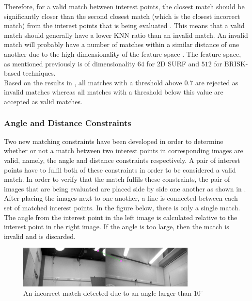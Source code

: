 \documentclass{article}
\begin{document}
Therefore, for a valid match between interest points, the closest match should be significantly closer than the second closest match (which is the closest incorrect match) from the interest points that is being evaluated \cite{Lowe2004}. This means that a valid match should generally have a lower KNN ratio than an invalid match. An invalid match will probably have a number of matches within a similar distance of one another due to the high dimensionality of the feature space \cite{Lowe2004}. The feature space, as mentioned previously is of dimensionality $64$ for 2D SURF and $512$ for BRISK-based techniques.\\

Based on the results in , all matches with a threshold above $0.7$ are rejected as invalid matches whereas all matches with a threshold below this value are accepted as valid matches.\\



\subsubsection{Angle and Distance Constraints}
\label{sec:angleDistanceConstraints}
Two new matching constraints have been developed in order to determine whether or not a match between two interest points in corresponding images are valid, namely, the angle and distance constraints respectively. A pair of interest points have to fulfil both of these constraints in order to be considered a valid match. In order to verify that the match fulfils these constraints, the pair of images that are being evaluated are placed side by side one another as shown in . After placing the images next to one another, a line is connected between each set of matched interest points. In the figure below, there is only a single match. The angle from the interest point in the left image is calculated relative to the interest point in the right image. If the angle is too large, then the match is invalid and is discarded.\\

\begin{figure}[h!] 
  \centering
    \includegraphics[width=0.8\textwidth]{../Drawings/constraints/t_20_hd_55_OG_Left_MG_Right_2_12.jpg}
    \caption{An incorrect match detected due to an angle larger than $10^\circ$}
    \label{fig:imagesSide}
\end{figure}
\end{document}
